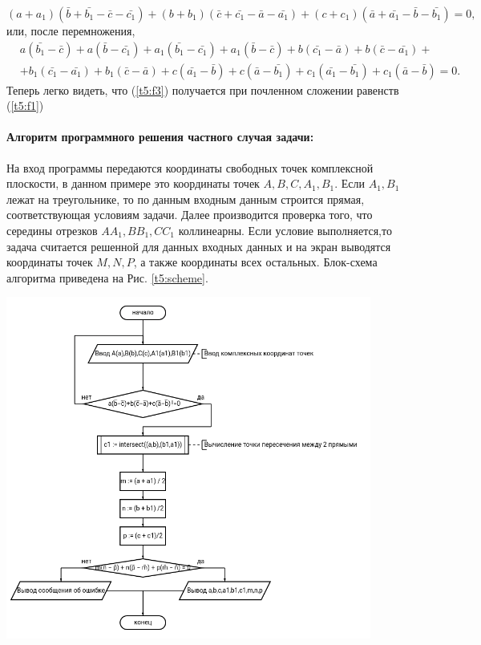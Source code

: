 {    \(
    (a+a_1)(\bar{b}+\bar{b_1}-\bar{c}-\bar{c_1})+(b+b_1 )(\bar{c}+\bar{c_1}-\bar{a}-\bar{a_1})+(c+c_1)(\bar{a}+\bar{a_1}-\bar{b}-\bar{b_1})=0,
    \) или, после перемножения,
    \begin{equation}
        \begin{aligned}
             & a(\bar{b_1} - \bar{c}) + a(\bar{b}- \bar{c_1}) + a_1(\bar{b_1} - \bar{c_1}) + a_1(\bar{b}- \bar{c}) + b(\bar{c_1} - \bar{a}) + b(\bar{c}- \bar{a_1}) + \\
             & +b_1(\bar{c_1}-\bar{a_1})+b_1 (\bar{c}-\bar{a})+c(\bar{a_1}-\bar{b})+c(\bar{a}-\bar{b_1})+c_1 (\bar{a_1}-\bar{b_1} )+c_1(\bar{a}-\bar{b})=0.
        \end{aligned}
        \label{t5:f3}
    \end{equation}
    Теперь легко видеть, что (\ref{t5:f3}) получается при почленном сложении
    равенств (\ref{t5:f1})
    \paragraph{Алгоритм программного решения частного случая задачи:} На вход программы передаются координаты свободных точек комплексной плоскости, в данном примере это координаты точек \(A,B,C,A_1,B_1\). Если \(A_1,B_1\) лежат на треугольнике, то по данным входным данным строится прямая, соответствующая условиям задачи. Далее производится проверка того, что середины отрезков \(AA_1,BB_1,CC_1\) коллинеарны. Если условие выполняется,то задача считается решенной для данных входных данных и на экран выводятся координаты точек \(M,N,P\), а также координаты всех остальных. Блок-схема алгоритма приведена на Рис. \ref{t5:scheme}.
    \begin{center}
        \includegraphics[width=0.9\textwidth]{images/task5-diagram.png}
        \label{t5:scheme}
    \end{center}

}
